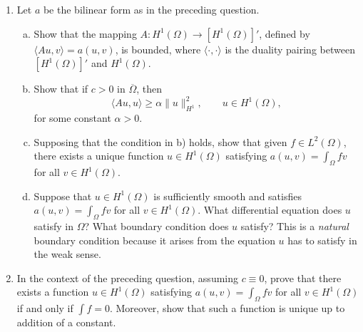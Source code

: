 \documentclass[11pt]{amsart}
\begin{document}
\begin{enumerate}[1.]
\begin{enumerate}[a)]
Show that if $c\geq0$ then 
\begin{equation*}
\langle Au,u\rangle \geq \alpha\|u\|_{H^1}^2,
\qquad u\in H^1_0(\Omega),
\end{equation*}
for some constant $\alpha>0$.
Show also that the inequality is still true (with possibly different $\alpha>0$) if $c$ is slightly negative.
\item
Supposing that $c\geq0$, show that given $f\in L^2(\Omega)$, there exists a unique function $u\in H^1_0(\Omega)$ satisfying $a(u,v)=\int_\Omega fv$ for all $v\in H^1_0(\Omega)$.
\item
Suppose that $u\in H^1_0(\Omega)$ is sufficiently smooth and satisfies $a(u,v)=\int_\Omega fv$ for all $v\in H^1_0(\Omega)$.
What differential equation does $u$ satisfy in $\Omega$?
Is $u=0$ on $\partial\Omega$?
In the language of variational methods,
this is an {\em essential} boundary condition because it is incorporated into the space $H^1_0(\Omega)$.
\end{enumerate}
\item
Let $a$ be the bilinear form as in the preceding question.
\begin{enumerate}[a)]
\item
Show that the mapping $A:H^1(\Omega)\to[H^1(\Omega)]'$, defined by $\langle Au,v\rangle=a(u,v)$, is bounded, where $\langle\cdot,\cdot\rangle$ is the duality pairing between $[H^1(\Omega)]'$ and $H^1(\Omega)$.
\item
Show that if $c>0$ in $\overline\Omega$, then
\begin{equation*}
\langle Au,u\rangle \geq \alpha\|u\|_{H^1}^2,
\qquad u\in H^1(\Omega),
\end{equation*}
for some constant $\alpha>0$.
\item
Supposing that the condition in b) holds, show that given $f\in L^2(\Omega)$, there exists a unique function $u\in H^1(\Omega)$ satisfying $a(u,v)=\int_\Omega fv$ for all $v\in H^1(\Omega)$.
\item
Suppose that $u\in H^1(\Omega)$ is sufficiently smooth and satisfies $a(u,v)=\int_\Omega fv$ for all $v\in H^1(\Omega)$.
What differential equation does $u$ satisfy in $\Omega$?
What boundary condition does $u$ satisfy?
This is a {\em natural} boundary condition because it arises from the equation $u$ has to satisfy in the weak sense.
\end{enumerate}
\item
In the context of the preceding question, assuming $c\equiv0$, prove that 
there exists a function $u\in H^1(\Omega)$ satisfying $a(u,v)=\int_\Omega fv$ for all $v\in H^1(\Omega)$ if and only if $\int f = 0$.
Moreover, show that such a function is unique up to addition of a constant.
\end{enumerate}
\end{document}
